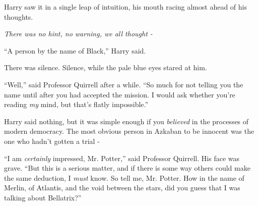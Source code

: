 Harry saw it in a single leap of intuition, his mouth racing almost ahead of his thoughts.

\emph{There was no hint, no warning, we all thought -}

``A person by the name of Black,'' Harry said.

There was silence. Silence, while the pale blue eyes stared at him.

``Well,'' said Professor Quirrell after a while. ``So much for not telling you the name until after you had accepted the mission. I would ask whether you're reading \emph{my} mind, but that's flatly impossible.''

Harry said nothing, but it was simple enough if you \emph{believed} in the processes of modern democracy. The most obvious person in Azkaban to be innocent was the one who hadn't gotten a trial -

``I am \emph{certainly} impressed, Mr. Potter,'' said Professor Quirrell. His face was grave. ``But this is a serious matter, and if there is some way others could make the same deduction, I \emph{must} know. So tell me, Mr. Potter. How in the name of Merlin, of Atlantis, and the void between the stars, did you guess that I was talking about Bellatrix?''
